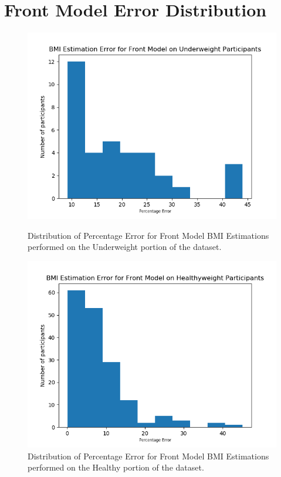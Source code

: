 \documentclass[conference]{IEEEtran}
\begin{document}
\section{Front Model Error Distribution}

\begin{figure}[H]
    \centering
    \begin{minipage}[b]{0.35\textwidth}
    \includegraphics[width=\linewidth]{frontundererror.png}
    \caption{Distribution of Percentage Error for Front Model BMI Estimations performed on the Underweight portion of the dataset.}
    \label{fig:frontundererror}
    \end{minipage}
    \hspace{1cm}
    \begin{minipage}[b]{0.35\textwidth}
    \includegraphics[width=\linewidth]{fronthealthyerror.png}
    \caption{Distribution of Percentage Error for Front Model BMI Estimations performed on the Healthy portion of the dataset.}
    \label{fig:fronthealthyerror}
    \end{minipage}
\end{figure}
\end{document}
